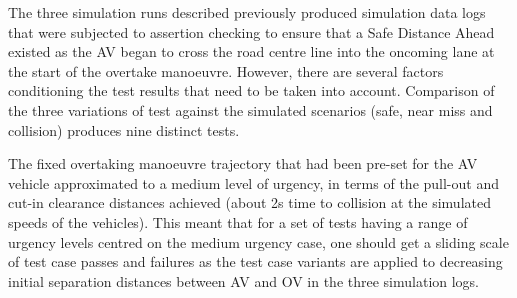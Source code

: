 The three simulation runs described previously produced simulation data logs that were subjected to assertion checking to ensure that a Safe Distance Ahead existed as the AV began to cross the road centre line into the oncoming lane at the start of the overtake manoeuvre. However, there are several factors conditioning the test results that need to be taken into account. 
%
Comparison of the three variations of test against the simulated scenarios (safe, near miss and collision) produces nine distinct tests. 

The fixed overtaking manoeuvre trajectory that had been pre-set for the AV vehicle approximated to a medium level of urgency, in terms of the pull-out and cut-in clearance distances achieved (about 2s time to collision at the simulated speeds of the vehicles). This meant that for a set of tests having a range of urgency levels centred on the medium urgency case, one should get a sliding scale of test case passes and failures as the test case variants are applied to decreasing initial separation distances between AV and OV in the three simulation logs. 



